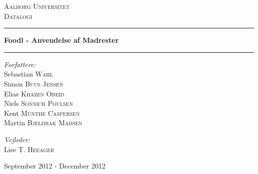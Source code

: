 \begin{titlingpage}
\centering
\vspace*{1.0cm}

\textsc{\LARGE Aalborg Universitet}\\[0.75cm]
\textsc{\Large Datalogi}\\[1.75cm]

\hrule
{ \huge \bfseries Foodl - Anvendelse af Madrester}
\vspace{0.5cm}
\hrule
\vspace{0.75cm}

  \begin{flushleft} \large
    \vspace{0pt}
    \emph{Forfattere:}\\
    Sebastian \textsc{Wahl}\\
    Simon \textsc{Buus Jensen}\\
    Elias \textsc{Khazen Obeid}\\
    Niels \textsc{Sonnich Poulsen}\\
    Kent \textsc{Munthe Caspersen}\\
    Martin \textsc{Bjeldbak Madsen}\\
  \end{flushleft}

  \begin{flushright} \large
  \vspace{-132pt}
  \emph{Vejleder:}\\
  Lise T. \textsc{Heeager}
  \end{flushright}


\vfill

{\large September 2012 - December 2012}

\end{titlingpage}
